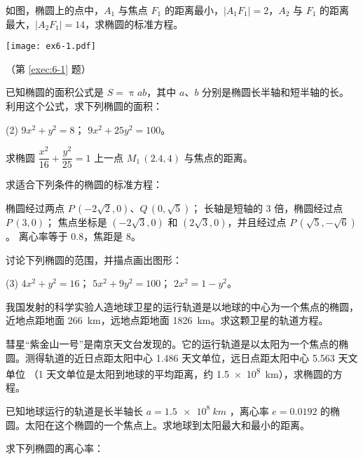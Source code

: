 \begin{Exercise}
  \begin{question}
    \item \label{exec:6-1}如图，椭圆上的点中，$A_1$ 与焦点 $F_1$ 的距离最小，$|A_1F_1|=2$，$A_2$ 与 $F_1$ 的距离最大，$|A_2F_1|=14$，求椭圆的标准方程。
    \begin{figurehere}
      \begin{minipage}{\linewidth}\centering
        \texttt{[image: ex6-1.pdf]}
        \caption*{（第 \ref{exec:6-1} 题）}
      \end{minipage}
    \end{figurehere}
    \item 已知椭圆的面积公式是 $S=\uppi ab$，其中 $a$、$b$ 分别是椭圆长半轴和短半轴的长。利用这个公式，求下列椭圆的面积：
    \begin{tasks}(2)
      \task $9x^2+y^2=8$；
      \task $9x^2+25y^2=100$。
    \end{tasks}
    \item 求椭圆 $\dfrac{x^2}{16}+\dfrac{y^2}{25}=1$ 上一点 $M_1\,(2.4,4)$ 与焦点的距离。\par\smallskip
    \item 求适合下列条件的椭圆的标准方程：
    \begin{tasks}
      \task 椭圆经过两点 $P\,(-2\sqrt{2},0)$、$Q\,(0,\sqrt{5})$；
      \task 长轴是短轴的 3 倍，椭圆经过点 $P\,(3,0)$；
      \task 焦点坐标是 $(-2\sqrt{3},0)$ 和 $(2\sqrt{3},0)$，并且经过点 $P\,(\sqrt{5},-\sqrt{6})$。
      \task 离心率等于 0.8，焦距是 8。
    \end{tasks}
    \item 讨论下列椭圆的范围，并描点画出图形：
    \begin{tasks}(3)
      \task $4x^2+y^2=16$；
      \task $5x^2+9y^2=100$；
      \task $2x^2=1-y^2$。
    \end{tasks}
    \item 我国发射的科学实验人造地球卫星的运行轨道是以地球的中心为一个焦点的椭圆，近地点距地面 \qty{266}{km}，远地点距地面 \qty{1826}{km}。求这颗卫星的轨道方程。
    \item 彗星“紫金山一号”是南京天文台发现的。它的运行轨道是以太阳为一个焦点的椭圆。测得轨道的近日点距太阳中心 1.486 天文单位，远日点距太阳中心 5.563 天文单位 （1 天文单位是太阳到地球的平均距离，约 \qty{1.5e8}{km}），求椭圆的方程。
    \item 已知地球运行的轨道是长半轴长 $a=\qty{1.5e8}{km}$ ，离心率 $e={0.0192}$ 的椭圆。太阳在这个椭圆的一个焦点上。求地球到太阳最大和最小的距离。
    \item 求下列椭圆的离心率：

\end{question}
\end{Exercise}
